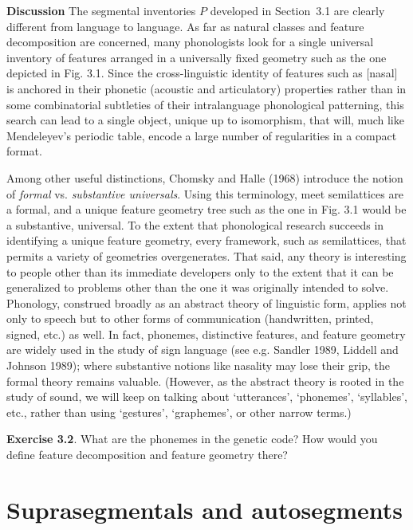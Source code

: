\bigskip
\noindent
{\bf Discussion} The segmental inventories $P$ developed in Section~3.1 are clearly
different from language to language. As far as natural classes and feature
decomposition are concerned, many phonologists look for a single universal
inventory of features arranged in a universally fixed geometry such as the one
depicted in Fig. 3.1. Since the cross-linguistic identity of features such
as [nasal] is anchored in their phonetic (acoustic and articulatory)
properties rather than in some combinatorial subtleties of their
intralanguage phonological patterning, this search can lead to a single
object, unique up to isomorphism, that will, much like Mendeleyev's periodic
table, encode a large number of regularities in a compact
format. 

Among other useful distinctions, Chomsky and Halle (1968)\nocite{Chomsky:1965}
introduce the notion of {\it formal} vs. {\it substantive
  universals}. Using this
terminology, meet semilattices are a formal, and a unique feature geometry
tree such as the one in Fig. 3.1 would be a substantive, universal. To the
extent that phonological research succeeds in identifying a unique feature
geometry, every framework, such as semilattices, that permits a variety of
geometries overgenerates.  That said, any theory is
interesting to people other than its immediate developers only to the extent
that it can be generalized to problems other than the one it was originally
intended to solve. Phonology, construed broadly as an abstract theory of
linguistic form, applies not only to speech but to other forms of
communication (handwritten, printed, signed, etc.) as well. In fact, phonemes,
distinctive features, and feature geometry are widely used in the study of
sign language (see e.g. Sandler 1989, Liddell and Johnson 1989);
\nocite{Sandler:1989} \nocite{Liddell:1989} where substantive notions like
nasality may lose their grip, the formal theory remains valuable. (However, as
the abstract theory is rooted in the study of sound, we will keep on talking
about `utterances', `phonemes', `syllables', etc., rather than using
`gestures', `graphemes', or other narrow terms.)

\smallskip\noindent
{\bf Exercise 3.2}. What are the phonemes in the genetic code? How would 
you define feature decomposition and feature geometry there? 

\section{Suprasegmentals and autosegments}

